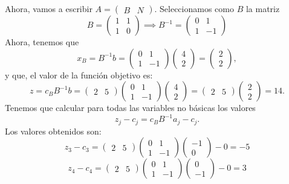 \documentclass[11pt,table]{article}
\begin{document}
    Ahora, vamos a escribir \(A = \begin{pmatrix} B & N \end{pmatrix}\). Seleccionamos como \(B\) la matriz
    \[
    B = \begin{pmatrix} 1 & 1 \\ 1 & 0 \end{pmatrix} \implies B^{-1} = \begin{pmatrix}    0 & 1 \\ 1 & -1 \end{pmatrix}
    \]
    Ahora, tenemos que 
    \[
    x_B = B^{-1}b =      \begin{pmatrix}    0 & 1 \\ 1 & -1 \end{pmatrix} \begin{pmatrix} 4 \\ 2\end{pmatrix} = \begin{pmatrix} 2 \\ 2 \end{pmatrix},
    \]
    y que, el valor de la función objetivo es:
    \[
    z = c_B B^{-1}b = \begin{pmatrix} 2 & 5\end{pmatrix} \begin{pmatrix}    0 & 1 \\ 1 & -1 \end{pmatrix} \begin{pmatrix} 4 \\ 2\end{pmatrix}   = \begin{pmatrix} 2 & 5\end{pmatrix}  \begin{pmatrix} 2 \\ 2 \end{pmatrix} = 14.
    \]
    Tenemos que calcular para todas las variables no básicas los valores
    \[
    z_j - c_j = c_B B^{-1}a_j - c_j.
    \]
    Los valores obtenidos son:
    \[
    z_3 - c_3 =     \begin{pmatrix} 2 & 5\end{pmatrix} \begin{pmatrix}    0 & 1 \\ 1 & -1 \end{pmatrix} \begin{pmatrix} -1 \\ 0 \end{pmatrix} - 0 = -5
    \]
    \[
    z_4 - c_4 =     \begin{pmatrix} 2 & 5\end{pmatrix} \begin{pmatrix}    0 & 1 \\ 1 & -1 \end{pmatrix} \begin{pmatrix} 0 \\ -1 \end{pmatrix} - 0 = 3
    \]
\end{document}
